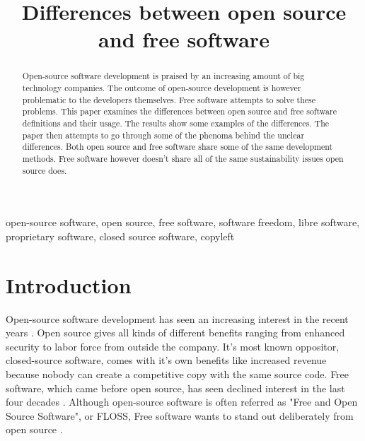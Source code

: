 \documentclass[conference]{IEEEtran}
\begin{document}
\title{Differences between open source and free software}

\author{
}

\maketitle

\begin{abstract}
Open-source software development is praised by an increasing amount of big technology companies. The outcome of open-source development is however problematic to the developers themselves. Free software attempts to solve these problems. This paper examines the differences between open source and free software definitions and their usage. The results show some examples of the differences. The paper then attempts to go through some of the phenoma behind the unclear differences. Both open source and free software share some of the same development methods. Free software however doesn't share all of the same sustainability issues open source does.
\end{abstract}

\begin{IEEEkeywords}
	open-source software, open source, free software, software freedom, libre software, proprietary software, closed source software, copyleft
\end{IEEEkeywords}

\section{Introduction}
Open-source software development has seen an increasing interest in the recent years \cite{openvsclosed}. Open source gives all kinds of different benefits ranging from enhanced security to labor force from outside the company. It's most known oppositor, closed-source software, comes with it's own benefits like increased revenue because nobody can create a competitive copy with the same source code. Free software, which came before open source, has seen declined interest in the last four decades \cite{declinewiki}. Although open-source software is often referred as "Free and Open Source Software", or FLOSS, Free software wants to stand out deliberately from open source \cite{stallman2002free}.
\end{document}
